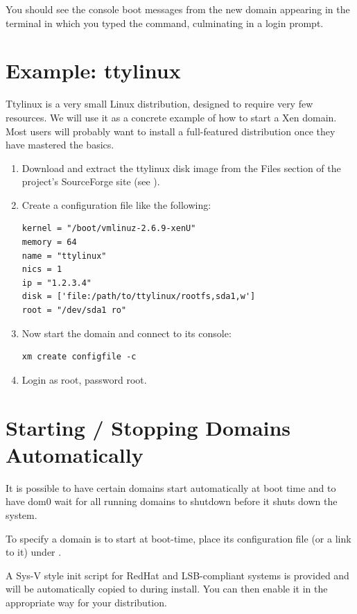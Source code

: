 \documentclass[11pt,twoside,final,openright]{report}
\begin{document}
You should see the console boot messages from the new domain 
appearing in the terminal in which you typed the command, 
culminating in a login prompt. 


\section{Example: ttylinux}

Ttylinux is a very small Linux distribution, designed to require very
few resources.  We will use it as a concrete example of how to start a
Xen domain.  Most users will probably want to install a full-featured
distribution once they have mastered the basics.

\begin{enumerate}
\item Download and extract the ttylinux disk image from the Files
section of the project's SourceForge site (see 
).
\item Create a configuration file like the following:
\begin{verbatim}
kernel = "/boot/vmlinuz-2.6.9-xenU"
memory = 64
name = "ttylinux"
nics = 1
ip = "1.2.3.4"
disk = ['file:/path/to/ttylinux/rootfs,sda1,w']
root = "/dev/sda1 ro"
\end{verbatim}
\item Now start the domain and connect to its console:
\begin{verbatim}
xm create configfile -c
\end{verbatim}
\item Login as root, password root.
\end{enumerate}


\section{Starting / Stopping Domains Automatically}

It is possible to have certain domains start automatically at boot
time and to have dom0 wait for all running domains to shutdown before
it shuts down the system.

To specify a domain is to start at boot-time, place its
configuration file (or a link to it) under .

A Sys-V style init script for RedHat and LSB-compliant systems is
provided and will be automatically copied to 
during install.  You can then enable it in the appropriate way for
your distribution.
\end{document}
